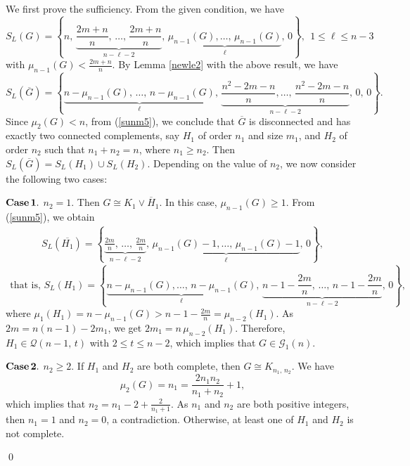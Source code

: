 \documentclass[12pt]{article}
\newenvironment{pf}{\medskip\noindent{Proof:  \hspace*{-.4cm}}
       \enspace}{\hfill \qed \newline \medskip}
\begin{document}
\begin{pf}
 We first prove the sufficiency. From the given condition, we have
 $$S_L(G)=\left\{n,\,\underbrace{\frac{2m+n}{n},\,\ldots,\,\frac{2m+n}{n}}_{n-\ell-2},\,\underbrace{\mu_{n-1}(G),\ldots,\,\mu_{n-1}(G)}_{\ell},\,0\right\}, ~~1\leq \ell\leq n-3$$
 with $\mu_{n-1}(G)<\frac{2m+n}{n}$. By Lemma \ref{newle2} with the above result, we have
\begin{equation}
    S_L(\overline{G})=\left\{\underbrace{n-\mu_{n-1}(G),\,\ldots,\,n-\mu_{n-1}(G)}_{\ell},\,\underbrace{\frac{n^2-2m-n}{n},\ldots,\,\frac{n^2-2m-n}{n}}_{n-\ell-2},\,0,\,0\right\}.\label{sunm5}
\end{equation}
Since $\mu_2(G)<n$, from (\ref{sunm5}), we conclude that
$\overline{G}$ is disconnected and has exactly two connected
complements, say $H_1$ of order $n_1$ and size $m_1$, and $H_2$ of
order $n_2$ such that $n_1+n_2=n$, where $n_1\geq n_2$. Then
$S_L(\overline{G})=S_L(H_1)\cup S_L(H_2)$. Depending on the value of
$n_2$, we now consider the following two cases:

\vspace*{3mm}

\noindent ${\bf Case\,1.}$ $n_2=1$. Then $G\cong K_1\vee
\overline{H}_1$. In this case, $\mu_{n-1}(G)\geq 1$. From
(\ref{sunm5}), we obtain
\begin{align}
    S_L(\overline{H_1})=\left\{\underbrace{\frac{2m}{n},\,\ldots,\,\frac{2m}{n}}_{n-\ell-2},\,\underbrace{\mu_{n-1}(G)-1,\ldots,\,\mu_{n-1}(G)-1}_{\ell},\,0\right\},\nonumber
\end{align}
$$~~\mbox{that is, }
    S_L(H_1)=\left\{\underbrace{n-\mu_{n-1}(G),\ldots,\,n-\mu_{n-1}(G)}_{\ell},\,\underbrace{n-1-\frac{2m}{n},\,\ldots,\,n-1-\frac{2m}{n}}_{n-\ell-2},\,0\right\},$$
where $\mu_1(H_1)=n-\mu_{n-1}(G)>n-1-\frac{2m}{n}=\mu_{n-2}(H_1)$.
 As $2m=n(n-1)-2m_1$, we get $2m_1=n\,\mu_{n-2}(H_1)$. Therefore, $H_1\in \mathcal{Q}(n-1,\,t)$ with $2\leq t\leq n-2$, which implies that $G\in \mathcal{G}_1(n)$.


\vspace*{3mm}

\noindent ${\bf Case\,2.}$ $n_2\geq 2$. If $H_1$ and $H_2$  are both
complete, then $G\cong K_{n_1,\,n_2}$. We have
 $$\mu_2(G)=n_1=\frac{2n_1n_2}{n_1+n_2}+1,$$
 which implies that $n_2=n_1-2+\frac{2}{n_1+1}$. As $n_1$ and $n_2$
 are both positive integers, then $n_1=1$ and $n_2=0$, a contradiction.
 Otherwise, at least one of $H_1$ and $H_2$ is not complete.

\vspace*{3mm}


\end{pf}
\end{document}
